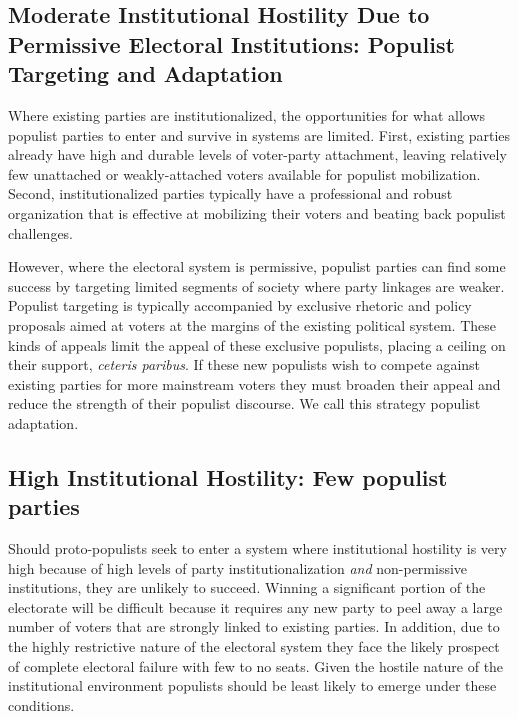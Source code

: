 \documentclass[a4paper,12pt]{article}\usepackage[]{graphicx}\usepackage[]{color}
\begin{document}
\subsection*{Moderate Institutional Hostility Due to Permissive Electoral Institutions: Populist Targeting and Adaptation}
Where existing parties are institutionalized, the opportunities for what allows populist parties to enter and survive in systems are limited. First, existing parties already have high and durable levels of voter-party attachment, leaving relatively few unattached or weakly-attached voters available for populist mobilization. Second, institutionalized parties typically have a professional and robust organization that is effective at mobilizing their voters and beating back populist challenges. 
\par
However, where the electoral system is permissive, populist parties can find some success by targeting limited segments of society where party linkages are weaker. Populist targeting is typically accompanied by exclusive rhetoric and policy proposals aimed at voters at the margins of the existing political system. These kinds of appeals limit the appeal of these exclusive populists, placing a ceiling on their support, \textit{ceteris paribus}. If these new populists wish to compete against existing parties for more mainstream voters they must broaden their appeal and reduce the strength of their populist discourse. We call this strategy populist adaptation. 

 \subsection*{High Institutional Hostility: Few populist parties}
Should proto-populists seek to enter a system where institutional hostility is very high because of high levels of party institutionalization \textit{and} non-permissive institutions, they are unlikely to succeed. Winning a significant portion of the electorate will be difficult because it requires any new party to peel away a large number of voters that are strongly linked to existing parties. In addition, due to the highly restrictive nature of the electoral system they face the likely prospect of complete electoral failure with few to no seats. Given the hostile nature of the institutional environment populists should be least likely to emerge under these conditions.

\end{document}
